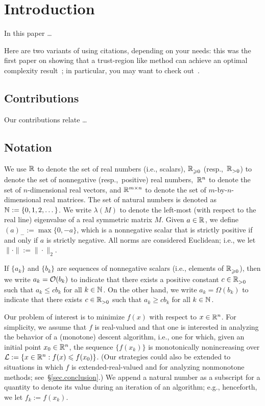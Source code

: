 
\section{Introduction}\label{sec.introduction}

In this paper \dots

Here are two variants of using citations, depending on your needs: this was the first paper on showing that a trust-region like method can achieve an optimal complexity result~\cite{CurtRobiSama17}; in particular, you may want to check out~\cite[Theorem~3.28]{CurtRobiSama17}.

\subsection{Contributions}

Our contributions relate \dots

\subsection{Notation}

We use $\mathbb{R}^{}$ to denote the set of real numbers (i.e., scalars), $\mathbb{R}^{}_{\geqslant0}$ (resp.,~$\mathbb{R}^{}_{>0}$) to denote the set of nonnegative (resp.,~positive) real numbers,~$\mathbb{R}^{n}$ to denote the set of $n$-dimensional real vectors, and $\mathbb{R}^{m \times n}$ to denote the set of $m$-by-$n$-dimensional real matrices.  The set of natural numbers is denoted as $\mathbb{N}^{} := \{0,1,2,\dots\}$.  We write $\lambda(M)$ to denote the left-most (with respect to the real line) eigenvalue of a real symmetric matrix $M$.  Given $a \in \mathbb{R}^{}$, we define $(a)_- := \max\{0,-a\}$, which is a nonnegative scalar that is strictly positive if and only if $a$ is strictly negative.  All norms are considered Euclidean; i.e., we let $\|\cdot\| := \|\cdot\|_2$.

If $\{a_k\}$ and $\{b_k\}$ are sequences of nonnegative scalars (i.e., elements of $\mathbb{R}^{}_{\geqslant0}$), then we write $a_k = \Ocal(b_k)$ to indicate that there exists a positive constant $c \in \mathbb{R}^{}_{>0}$ such that $a_k \leq cb_k$ for all $k \in \mathbb{N}^{}$.  On the other hand, we write $a_k = \Omega(b_k)$ to indicate that there exists $c \in \mathbb{R}^{}_{>0}$ such that $a_k \geq cb_k$ for all $k \in \mathbb{N}^{}$.

Our problem of interest is to minimize $f(x)$ with respect to $x \in \mathbb{R}^{n}$.  For simplicity, we assume that $f$ is real-valued and that one is interested in analyzing the behavior of a (monotone) descent algorithm, i.e., one for which, given an initial point $x_0 \in \mathbb{R}^{n}$, the sequence $\{f(x_k)\}$ is monotonically nonincreasing over $\Lcal := \{x \in \R{n} : f(x) \leq f(x_0)\}$.  (Our strategies could also be extended to situations in which $f$ is extended-real-valued and for analyzing nonmonotone methods; see~\S\ref{sec.conclusion}.)  We append a natural number as a subscript for a quantity to denote its value during an iteration of an algorithm; e.g., henceforth, we let $f_k := f(x_k)$.

